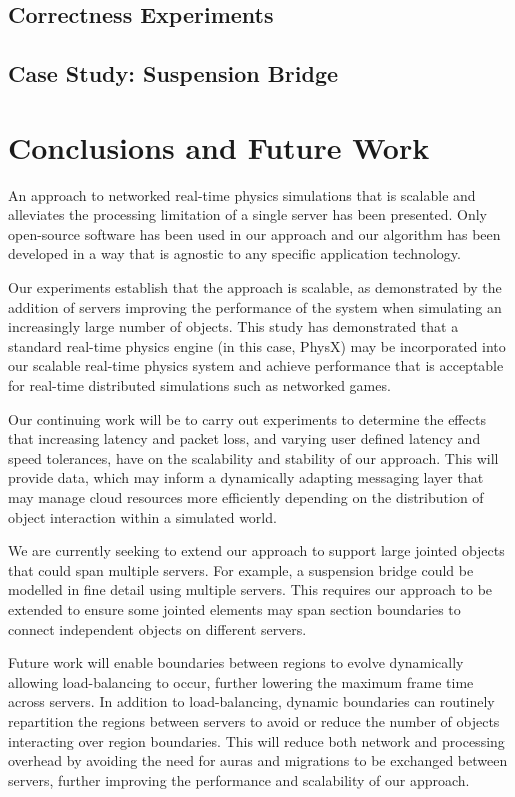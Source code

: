 \section{Correctness Experiments}
\section{Case Study: Suspension Bridge}

\chapter{Conclusions and Future Work}
An approach to networked real-time physics simulations that is scalable and alleviates the processing limitation of a single server has been presented. Only open-source software has been used in our approach and our algorithm has been developed in a way that is agnostic to any specific application technology.

Our experiments establish that the approach is scalable, as demonstrated by the addition of servers improving the performance of the system when simulating an increasingly large number of objects. This study has demonstrated that a standard real-time physics engine (in this case, PhysX) may be incorporated into our scalable real-time physics system and achieve performance that is acceptable for real-time distributed simulations such as networked games.

Our continuing work will be to carry out experiments to determine the effects that increasing latency and packet loss, and varying user defined latency and speed tolerances, have on the scalability and stability of our approach. This will provide data, which may inform a dynamically adapting messaging layer that may manage cloud resources more efficiently depending on the distribution of object interaction within a simulated world. 

We are currently seeking to extend our approach to support large jointed objects that could span multiple servers. For example, a suspension bridge could be modelled in fine detail using multiple servers. This requires our approach to be extended to ensure some jointed elements may span section boundaries to connect independent objects on different servers. 

Future work will enable boundaries between regions to evolve dynamically allowing load-balancing to occur, further lowering the maximum frame time across servers. In addition to load-balancing, dynamic boundaries can routinely repartition the regions between servers to avoid or reduce the number of objects interacting over region boundaries. This will reduce both network and processing overhead by avoiding the need for auras and migrations to be exchanged between servers, further improving the performance and scalability of our approach.
